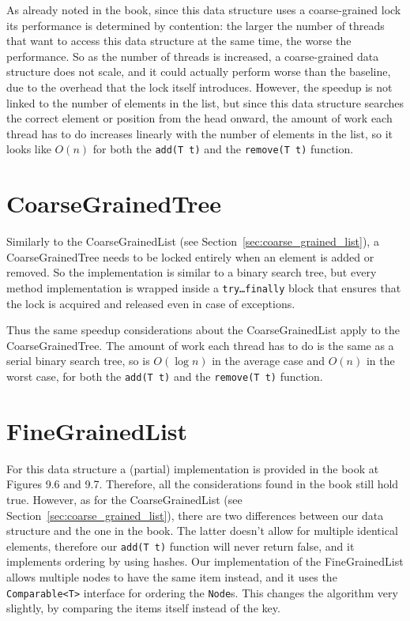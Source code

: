 \documentclass[12pt, oneside]{article}   	%
\begin{document}
As already noted in the book, since this data structure uses a coarse-grained lock its performance is determined by contention: the larger the number of threads that want to access this data structure at the same time, the worse the performance. So as the number of threads is increased, a coarse-grained data structure does not scale, and it could actually perform worse than the baseline, due to the overhead that the lock itself introduces. However, the speedup is not linked to the number of elements in the list, but since this data structure searches the correct element or position from the head onward, the amount of work each thread has to do increases linearly with the number of elements in the list, so it looks like $O(n)$ for both the \texttt{add(T t)} and the \texttt{remove(T t)} function.


\section{CoarseGrainedTree}
Similarly to the CoarseGrainedList (see Section~\ref{sec:coarse_grained_list}), a CoarseGrainedTree needs to be locked entirely when an element is added or removed. So the implementation is similar to a binary search tree, but every method implementation is wrapped inside a \texttt{try\dots{}finally} block that ensures that the lock is acquired and released even in case of exceptions.

Thus the same speedup considerations about the CoarseGrainedList apply to the CoarseGrainedTree. The amount of work each thread has to do is the same as a serial binary search tree, so is $O(\log n)$ in the average case and $O(n)$ in the worst case, for both the \texttt{add(T t)} and the \texttt{remove(T t)} function.

\section{FineGrainedList}
For this data structure a (partial) implementation is provided in the book at Figures 9.6 and 9.7. Therefore, all the considerations found in the book still hold true. However, as for the CoarseGrainedList (see Section~\ref{sec:coarse_grained_list}), there are two differences between our data structure and the one in the book. The latter doesn't allow for multiple identical elements, therefore our \texttt{add(T t)} function will never return false, and it implements ordering by using hashes. Our implementation of the FineGrainedList allows multiple nodes to have the same item instead, and it uses the \texttt{Comparable<T>} interface for ordering the \texttt{Node}s. This changes the algorithm very slightly, by comparing the items itself instead of the key.
\end{document}
